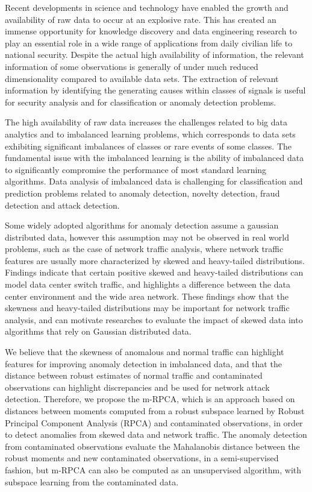 {Recent developments in science and technology have enabled the growth and availability of raw data to occur at an explosive rate. This has created an immense opportunity for knowledge discovery and data engineering research to play an essential role in a wide range of applications from daily civilian life to national security. Despite the actual high availability of information, the relevant information of some observations is generally of under much reduced dimensionality compared to available data sets. The extraction of relevant information by identifying the generating causes within classes of signals is useful for security analysis and for classification or anomaly detection problems. 

The high availability of raw data increases the challenges related to big data analytics and to imbalanced learning problems, which corresponds to data sets exhibiting significant imbalances of classes or rare events of some classes. The fundamental issue with the imbalanced learning is the ability of imbalanced data to significantly compromise the performance of most standard learning algorithms. Data analysis of imbalanced data is challenging for classification and prediction problems related to anomaly detection, novelty detection, fraud detection and attack detection.

Some widely adopted algorithms for anomaly detection assume a gaussian distributed data, however this assumption may not be observed in real world problems, such as the case of network traffic analysis, where network traffic features are usually more characterized by skewed and heavy-tailed distributions. Findings indicate that certain positive skewed and heavy-tailed distributions can model data center switch traffic, and highlights a difference between the data center environment and the wide area network. These findings show that the skewness and heavy-tailed distributions may be important for network traffic analysis, and can motivate researches to evaluate the impact of skewed data into algorithms that rely on Gaussian distributed data. 

We believe that the skewness of anomalous and normal traffic can highlight features for improving anomaly detection in imbalanced data, and that the distance between robust estimates of normal traffic and contaminated observations can highlight discrepancies and be used for network attack detection. Therefore, we propose the m-RPCA, which is an approach based on distances between moments computed from a robust subspace learned by Robust Principal Component Analysis (RPCA) and contaminated observations, in order to detect anomalies from skewed data and network traffic. The anomaly detection from contaminated observations evaluate the Mahalanobis distance between the robust moments and new contaminated observations, in a semi-supervised fashion, but m-RPCA can also be computed as an unsupervised algorithm, with subspace learning from the contaminated data. 

}
